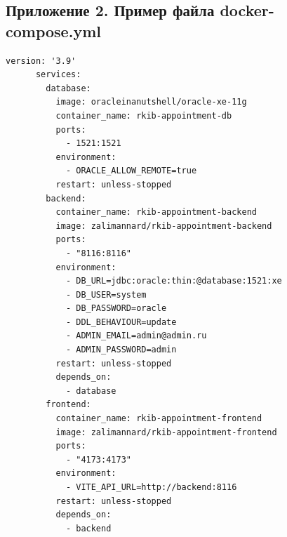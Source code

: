 \documentclass[a4paper,article]{article}
\begin{document}
\begin{sloppypar}
\begin{appendices}
        \newpage
        
        \section*{Приложение 2. Пример файла docker-compose.yml}\label{dockercomposeyml}
        \setcounter{section}{2}
        
        \begin{lstlisting}[]
    version: '3.9'
      services:
        database:
          image: oracleinanutshell/oracle-xe-11g
          container_name: rkib-appointment-db
          ports:
            - 1521:1521
          environment:
            - ORACLE_ALLOW_REMOTE=true
          restart: unless-stopped
        backend:
          container_name: rkib-appointment-backend
          image: zalimannard/rkib-appointment-backend
          ports:
            - "8116:8116"
          environment:
            - DB_URL=jdbc:oracle:thin:@database:1521:xe
            - DB_USER=system
            - DB_PASSWORD=oracle
            - DDL_BEHAVIOUR=update
            - ADMIN_EMAIL=admin@admin.ru
            - ADMIN_PASSWORD=admin
          restart: unless-stopped
          depends_on:
            - database
        frontend:
          container_name: rkib-appointment-frontend
          image: zalimannard/rkib-appointment-frontend
          ports:
            - "4173:4173"
          environment:
            - VITE_API_URL=http://backend:8116
          restart: unless-stopped
          depends_on:
            - backend
        \end{lstlisting}
    \end{appendices}

\end{sloppypar}
\end{document}
